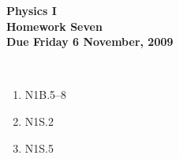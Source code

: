 \documentclass[12pt]{article}
\begin{document}
\pagestyle{empty}
 
\begin{center}
{\large {\bf Physics I}}\\
\medskip
{\large {\bf Homework Seven}}\\
\medskip
{ {\bf Due Friday 6  November, 2009}}\\
\end{center}

\hspace{2mm}\\


\begin{enumerate}
\setlength{\itemsep}{-1mm}
  \item N1B.5--8
  \item N1S.2
  \item N1S.5
\end{enumerate}
\end{document}

